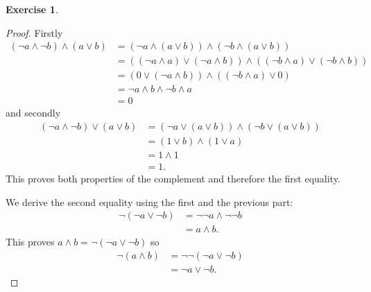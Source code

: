 \documentclass{article}
\theoremstyle{definition}
\newtheorem{question}{Exercise}
\begin{document}
\begin{question}
\begin{enumerate}[a)]
\begin{proof}
                  Firstly
                  \begin{align*}
                      (\neg a\wedge\neg b)\wedge(a\vee b) & =(\neg a\wedge(a\vee b))\wedge(\neg b\wedge (a\vee b))                               \\
                                                          & =((\neg a\wedge a)\vee (\neg a\wedge b))\wedge((\neg b\wedge a)\vee(\neg b\wedge b)) \\
                                                          & =(0\vee(\neg a\wedge b))\wedge((\neg b\wedge a)\vee 0)                               \\
                                                          & =\neg a\wedge b\wedge\neg b\wedge a                                                  \\
                                                          & =0
                  \end{align*}
                  and secondly
                  \begin{align*}
                      (\neg a\wedge\neg b)\vee(a\vee b) & =(\neg a\vee(a\vee b))\wedge(\neg b\vee (a\vee b)) \\
                                                        & =(1\vee b)\wedge(1\vee a)                          \\
                                                        & =1\wedge 1                                         \\
                                                        & =1.
                  \end{align*}
                  This proves both properties of the complement and therefore
                  the first equality.

                  We derive the second equality using the first and the previous
                  part:
                  \begin{align*}
                      \neg(\neg a\vee\neg b) & =\neg\neg a\wedge\neg\neg b \\
                                             & =a\wedge b.
                  \end{align*}
                  This proves \(a\wedge b=\neg(\neg a\vee\neg b)\) so
                  \begin{align*}
                      \neg(a\wedge b) & =\neg\neg(\neg a\vee\neg b) \\
                                      & =\neg a\vee\neg b.
                  \end{align*}
              \end{proof}


\end{enumerate}
\end{question}
\end{document}
